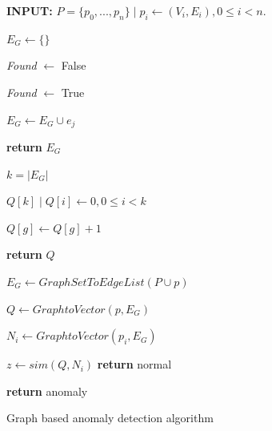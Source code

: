 \begin{figure}[h!]

\begin{algorithmic}[1]

\State \textbf{INPUT: } $P=\{p_0,...,p_n\} \mid p_i\gets (V_i, E_i), 0 \leq i < n.$

\State $E_G \gets \{\}$


\State \textit{Found} $\gets$ False

\State \textit{Found} $\gets$ True
\EndIf
\EndFor



\State $E_G \gets E_G \cup e_j$
\EndIf

\EndFor

\EndFor
\State \textbf{return} $E_G$

\EndProcedure



\end{algorithmic}


\begin{algorithmic}[1]


\State $k = |E_G|$

\State $Q[k] \mid Q[i] \gets 0, 0 \leq i < k$




\State $Q[g] \gets Q[g] + 1$
\EndIf

\EndFor

\EndFor


\State \textbf{return} $Q$

\EndProcedure

\end{algorithmic}


\begin{algorithmic}[1]


\State $E_G \gets GraphSetToEdgeList(P \cup p)$

\State $Q \gets GraphtoVector(p, E_G)$ 

\State $N_i \gets GraphtoVector(p_i, E_G)$

\State $z \gets sim(Q, N_i)$
\State \textbf{return} normal

\EndIf

\EndFor	

\State \textbf{return} anomaly
\EndProcedure



\end{algorithmic}


\caption{Graph based anomaly detection algorithm}\label{alg:graph_anomaly}
\end{figure}


